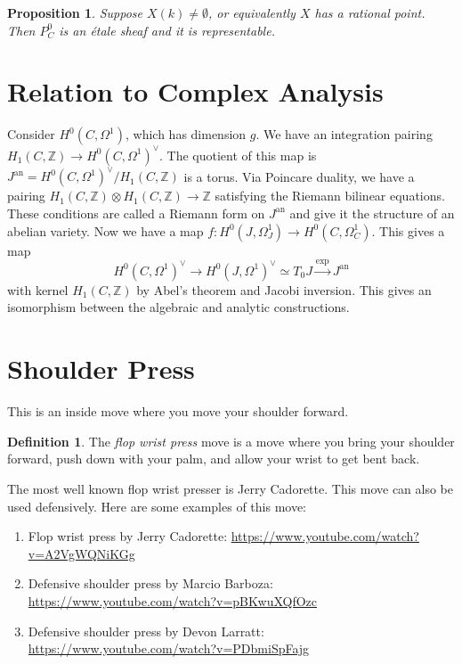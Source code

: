 \documentclass[leqno, openany]{memoir}
\newtheorem{prop}[thm]{Proposition}
\theoremstyle{definition}
\newtheorem{defn}[thm]{Definition}
\theoremstyle{remark}
\theoremstyle{plain}
\theoremstyle{definition}
\theoremstyle{remark}
\newcommand{\Z}{\mathbb{Z}}
\newcommand{\mr}[1]{\mathrm{#1}}
\begin{document}
\begin{prop}
    Suppose $X(k) \neq \emptyset$, or equivalently $X$ has a rational point. Then $P_C^0$ is an \'etale sheaf and it is representable.
\end{prop}

\section{Relation to Complex Analysis}%
\label{sec:relation_to_complex_analysis}

Consider $H^0(C, \Omega^1)$, which has dimension $g$. We have an integration pairing $H_1(C, \Z) \to {H^0(C, \Omega^1)}^{\vee}$. The quotient of this map is $J^{\mr{an}} = {H^0(C, \Omega^1)}^{\vee} / H_1(C, \Z)$ is a torus. Via Poincare duality, we have a pairing $H_1(C, \Z) \otimes H_1(C, \Z) \to \Z$ satisfying the Riemann bilinear equations. These conditions are called a Riemann form on $J^{\mr{an}}$ and give it the structure of an abelian variety. Now we have a map $f \colon H^0(J, \Omega^1_J) \to H^0(C, \Omega^1_C)$. This gives a map
\[ {H^0(C, \Omega^1)}^{\vee} \to {H^0(J, \Omega^1)}^{\vee} \simeq T_0 J \xrightarrow{\mr{exp}} J^{\mr{an}} \]
with kernel $H_1(C, \Z)$ by Abel's theorem and Jacobi inversion. This gives an isomorphism between the algebraic and analytic constructions.

\section{Shoulder Press}%
\label{sec:shoulder_press}

This is an inside move where you move your shoulder forward.

\begin{defn}
    The \textit{flop wrist press} move is a move where you bring your shoulder forward, push down with your palm, and allow your wrist to get bent back.
\end{defn}

The most well known flop wrist presser is Jerry Cadorette. This move can also be used defensively. Here are some examples of this move:

\begin{enumerate}
    \item Flop wrist press by Jerry Cadorette: \url{https://www.youtube.com/watch?v=A2VgWQNiKGg}
    \item Defensive shoulder press by Marcio Barboza: \url{https://www.youtube.com/watch?v=pBKwuXQfOzc}
    \item Defensive shoulder press by Devon Larratt: \url{https://www.youtube.com/watch?v=PDbmiSpFajg}
\end{enumerate}
\end{document}
